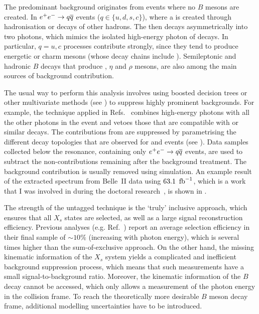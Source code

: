 The predominant background originates from events where no $B$ mesons are created.
In $e^+e^-\rightarrow q\overline q$ events ($q\in\{u,d,s,c\}$), where a \piz is created through hadronisation or decays of other hadrons.
The \piz then decays asymmetrically into two photons, which mimics the isolated high-energy photon of \BtoXsgamma decays.
In particular, $q={u,c}$ processes contribute strongly, since they tend to produce energetic \piz or charm mesons (whose decay chains include \piz).
Semileptonic and hadronic $B$ decays that produce \piz, $\eta$ and $\rho$ mesons, are also among the main sources of background contribution.

The usual way to perform this analysis involves using boosted decision trees or other multivariate methods (see ) to suppress highly prominent backgrounds.
For example, the technique applied in Refs.~\cite{CLEO:2001gsa,Belle:2009nth} combines high-energy photons with all the other photons in the event and vetoes those that are compatible with \piz or similar decays.
The contributions from \epem\ra\qqbar are suppressed by parametrising the different decay topologies that are observed for \BB and \qqbar events (see ).
Data samples collected below the \FourS resonance, containing only $e^+e^-\rightarrow q\overline q$ events, are used to subtract the non-\BB contributions remaining after the background treatment.
The \BB background contribution is usually removed using simulation.
An example result of the extracted \BtoXsgamma spectrum from Belle~II data using $63.1~\mbox{\,fb}^{-1}$, which is a work that I was involved in during the doctoral research~\cite{Collaboration:2302}, is shown in .

The strength of the untagged technique is the `truly' inclusive approach, which ensures that all $X_s$ states are selected, as well as a large signal reconstruction efficiency.
Previous analyses (e.g. Ref.~\cite{Belle:2009nth}) report an average selection efficiency in their final sample of $\sim10\%$ (increasing with photon energy), which is several times higher than the sum-of-exclusive approach.
On the other hand, the missing kinematic information of the $X_s$ system yields a complicated and inefficient background suppression process, which means that such measurements have a small signal-to-background ratio.
Moreover, the kinematic information of the $B$ decay cannot be accessed, which only allows a measurement of the photon energy in the \epem collision frame.
To reach the theoretically more desirable $B$ meson decay frame, additional modelling uncertainties have to be introduced.


